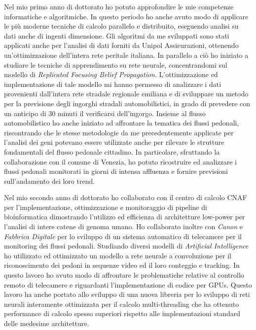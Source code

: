 {Nel mio primo anno di dottorato ho potuto approfondire le mie competenze informatiche e algoritmiche.
In questo periodo ho anche avuto modo di applicare le più moderne tecniche di calcolo parallelo e distribuito, eseguendo analisi su dati anche di ingenti dimensione.
Gli algoritmi da me sviluppati sono stati applicati anche per l'analisi di dati forniti da Unipol Assicurazioni, ottenendo un'ottimizzazione dell'intera rete peritale italiana.
In parallelo a ciò ho iniziato a studiare le tecniche di apprendimento su rete neurale, concentrandomi sul modello di \emph{Replicated Focusing Belief Propagation}.
L'ottimizzazione ed implementazione di tale modello mi hanno permesso di analizzare i dati provenienti dall'intera rete stradale regionale emiliana e di sviluppare un metodo per la previsione degli ingorghi stradali automobilistici, in grado di prevedere con un anticipo di 30 minuti il verificarsi dell'ingorgo.
Insieme al flusso automobilistico ho anche iniziato ad affrontare la tematica dei flussi pedonali, riscontrando che le stesse metodologie da me precedentemente applicate per l'analisi dei geni potevano essere utilizzate anche per rilevare le strutture fondamentali del flusso pedonale cittadino.
In particolare, sfruttando la collaborazione con il comune di Venezia, ho potuto ricostruire ed analizzare i flussi pedonali monitorati in giorni di intensa affluenza e fornire previsioni sull'andamento dei loro trend.

Nel mio secondo anno di dottorato ho collaborato con il centro di calcolo CNAF per l'implementazione, ottimizzazione e monitoraggio di pipeline di bioinformatica dimostrando l'utilizzo ed efficienza di architetture low-power per l'analisi di intere catene di genoma umano.
Ho collaborato inoltre con \emph{Canon} e \emph{Fabbrica Digitale} per lo sviluppo di un sistema automatico di telecamere per il monitoring dei flussi pedonali.
Studiando diversi modelli di \emph{Artificial Intelligence} ho utilizzato ed ottimizzato un modello a rete neurale a convoluzione per il riconoscimento dei pedoni in sequenze video ed il loro conteggio e tracking.
In questo lavoro ho avuto modo di affrontare le problematiche relative al controllo remoto di telecamere e riguardanti l'implementazione di codice per GPUs.
Questo lavoro ha anche portato allo sviluppo di una nuova libreria per lo sviluppo di reti neurali interamente ottimizzata per il calcolo multi-threading che ha ottenuto performance di calcolo spesso superiori rispetto alle implementazioni standard delle medesime architetture.

}
